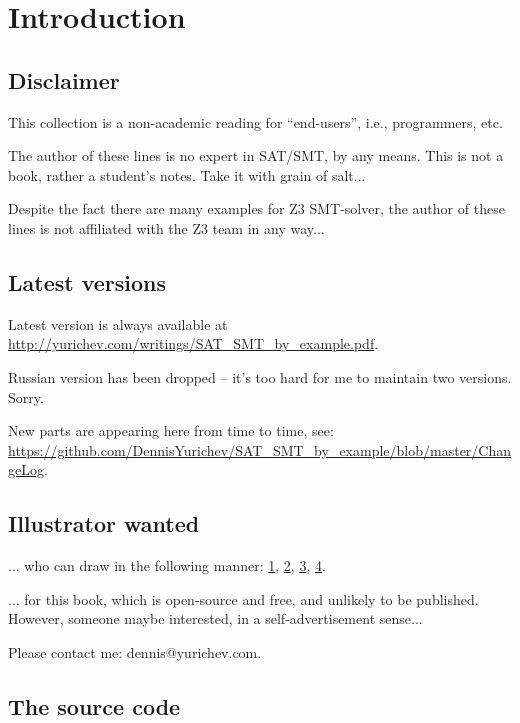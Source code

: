 \section{Introduction}

\subsection{Disclaimer}

This collection is a non-academic reading for ``end-users'', i.e., programmers, etc.

The author of these lines is no expert in SAT/SMT, by any means.
This is not a book, rather a student's notes.
Take it with grain of salt...

Despite the fact there are many examples for Z3 SMT-solver,
the author of these lines is not affiliated with the Z3 team in any way...

\subsection{Latest versions}

Latest version is always available at \url{http://yurichev.com/writings/SAT_SMT_by_example.pdf}.

Russian version has been dropped -- it's too hard for me to maintain two versions. Sorry.

New parts are appearing here from time to time, see: \url{https://github.com/DennisYurichev/SAT_SMT_by_example/blob/master/ChangeLog}.

\subsection{Illustrator wanted}

... who can draw in the following manner:
\href{https://github.com/DennisYurichev/RE-for-beginners/blob/master/cover.jpg}{1},
\href{https://github.com/DennisYurichev/RE-for-beginners/blob/master/cover2.jpg}{2},
\href{https://github.com/DennisYurichev/RE-for-beginners/blob/master/cover3.jpg}{3},
\href{https://github.com/DennisYurichev/RE-for-beginners/blob/master/cover4.jpg}{4}.

... for this book, which is open-source and free, and unlikely to be published.
However, someone maybe interested, in a self-advertisement sense...

Please contact me: dennis@yurichev.com.

\subsection{The source code}

